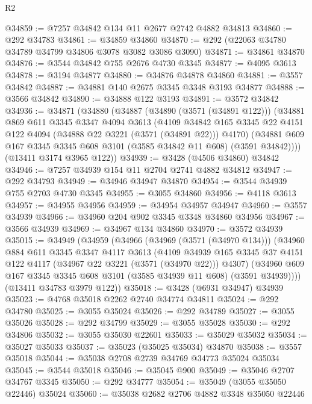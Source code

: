 \begin{lexlean}{R2}
\begin{coremodule}
@34859 := @7257 @34842 @134 @11 @2677 @2742 @4882 @34813
@34860 := @292 @34783
@34861 := @34859 @34860
@34870 := @292 (@22063 @34780 @34789 @34799 @34806 @3078 @3082 @3086 @3090)
@34871 := @34861 @34870
@34876 := @3544 @34842 @755 @2676 @4730 @3345
@34877 := @4095 @3613
@34878 := @3194 @34877
@34880 := @34876 @34878 @34860
@34881 := @3557 @34842
@34887 := @34881 @140 @2675 @3345 @3348 @3193 @34877
@34888 := @3566 @34842
@34890 := @34888 @122 @3193
@34891 := @3572 @34842
@34936 := @34871
    (@34880
      (@34887
        (@34890 (@3571 (@34891 @122)))
        (@34881
          @869
          @611
          @3345
          @3347
          @4094
          @3613
          (@4109
            @34842
            @165
            @3345
            @22
            @4151
            @122
            @4094
            (@34888 @22 @3221 (@3571 (@34891 @22)))
            @4170)
          (@34881 @609 @167 @3345 @3345 @608 @3101 (@3585 @34842 @11 @608) (@3591 @34842))))
      (@13411 @3174 @3965 @122))
@34939 := @3428 (@4506 @34860) @34842
@34946 := @7257 @34939 @154 @11 @2704 @2741 @4882 @34812
@34947 := @292 @34793
@34949 := @34946 @34947 @34870
@34954 := @3544 @34939 @755 @2703 @4730 @3345
@34955 := @3055 @34860
@34956 := @4118 @3613
@34957 := @34955 @34956
@34959 := @34954 @34957 @34947
@34960 := @3557 @34939
@34966 := @34960 @204 @902 @3345 @3348 @34860 @34956
@34967 := @3566 @34939
@34969 := @34967 @134 @34860
@34970 := @3572 @34939
@35015 := @34949
    (@34959
      (@34966
        (@34969 (@3571 (@34970 @134)))
        (@34960
          @884
          @611
          @3345
          @3347
          @4117
          @3613
          (@4109
            @34939
            @165
            @3345
            @37
            @4151
            @122
            @4117
            (@34967 @22 @3221 (@3571 (@34970 @22)))
            @4307)
          (@34960 @609 @167 @3345 @3345 @608 @3101 (@3585 @34939 @11 @608) (@3591 @34939))))
      (@13411 @34783 @3979 @122))
@35018 := @3428 (@6931 @34947) @34939
@35023 := @4768 @35018 @2262 @2740 @34774 @34811
@35024 := @292 @34780
@35025 := @3055 @35024
@35026 := @292 @34789
@35027 := @3055 @35026
@35028 := @292 @34799
@35029 := @3055 @35028
@35030 := @292 @34806
@35032 := @3055 @35030 @22601
@35033 := @35029 @35032
@35034 := @35027 @35033
@35037 := @35023 (@35025 @35034) @34870
@35038 := @3557 @35018
@35044 := @35038 @2708 @2739 @34769 @34773 @35024 @35034
@35045 := @3544 @35018
@35046 := @35045 @900
@35049 := @35046 @2707 @34767 @3345
@35050 := @292 @34777
@35054 := @35049 (@3055 @35050 @22446) @35024
@35060 := @35038 @2682 @2706 @4882 @3348 @35050 @22446

\end{coremodule}
\end{lexlean}
